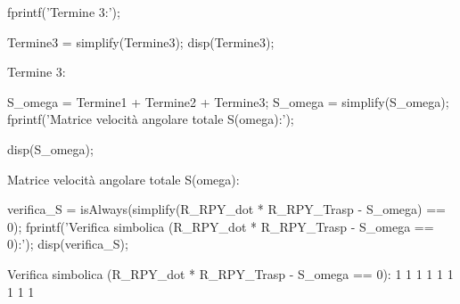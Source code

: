 \documentclass[11pt, a4paper]{article}
\begin{document}
\begin{matlabcode}
fprintf('Termine 3:');

Termine3 = simplify(Termine3);
disp(Termine3);
\end{matlabcode}
\begin{matlaboutput}
Termine 3:
\end{matlaboutput}
\begin{matlabcode}

S_omega = Termine1 + Termine2 + Termine3;
S_omega = simplify(S_omega);
fprintf('Matrice velocità angolare totale S(omega):');

disp(S_omega);
\end{matlabcode}
\begin{matlaboutput}
Matrice velocità angolare totale S(omega):
\end{matlaboutput}
\begin{matlabcode}
verifica_S = isAlways(simplify(R_RPY_dot * R_RPY_Trasp - S_omega) == 0);
fprintf('Verifica simbolica (R_RPY_dot * R_RPY_Trasp - S_omega == 0):\n');
disp(verifica_S);
\end{matlabcode}
\begin{matlaboutput}
Verifica simbolica (R_RPY_dot * R_RPY_Trasp - S_omega == 0):
     1     1     1
     1     1     1
     1     1     1
\end{matlaboutput}
\newpage
\end{document}
